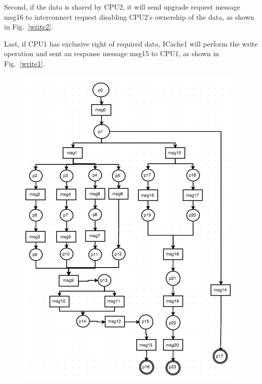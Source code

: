 \documentclass[conference]{IEEEtran}
\begin{document}
Second, if the data is shared by CPU2, it will send upgrade request message msg16 to interconnect request disabling  CPU2's ownership of the data, as shown in Fig.~\ref{write2}. 

Last, if CPU1 has exclusive right of required data, ICache1 will perform the write operation and sent an response message msg15 to CPU1, as shown in Fig.~\ref{write1}.


\begin{figure} 
 \centerline{
 \includegraphics[width=3.7In]{figures/Fig5.png}}
 

\end{figure}
\end{document}
